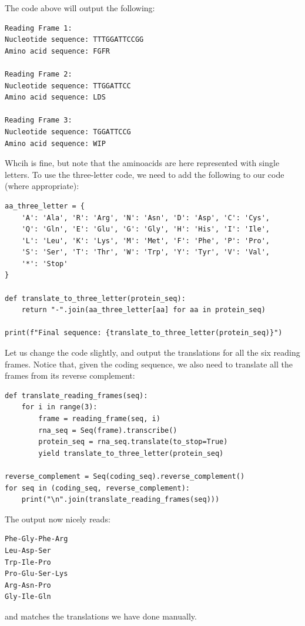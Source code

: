 The code above will output the following:

\vspace*{3mm}
\begin{lstlisting}
Reading Frame 1:
Nucleotide sequence: TTTGGATTCCGG
Amino acid sequence: FGFR

Reading Frame 2:
Nucleotide sequence: TTGGATTCC
Amino acid sequence: LDS

Reading Frame 3:
Nucleotide sequence: TGGATTCCG
Amino acid sequence: WIP
\end{lstlisting}

Whcih is fine, but note that the aminoacids are here represented with single letters. To use the three-letter code, we need to add the following to our code (where appropriate):

\vspace*{3mm}
\begin{lstlisting}
aa_three_letter = {
    'A': 'Ala', 'R': 'Arg', 'N': 'Asn', 'D': 'Asp', 'C': 'Cys',
    'Q': 'Gln', 'E': 'Glu', 'G': 'Gly', 'H': 'His', 'I': 'Ile',
    'L': 'Leu', 'K': 'Lys', 'M': 'Met', 'F': 'Phe', 'P': 'Pro',
    'S': 'Ser', 'T': 'Thr', 'W': 'Trp', 'Y': 'Tyr', 'V': 'Val',
    '*': 'Stop'
}

def translate_to_three_letter(protein_seq):
    return "-".join(aa_three_letter[aa] for aa in protein_seq)

print(f"Final sequence: {translate_to_three_letter(protein_seq)}")
\end{lstlisting}

Let us change the code slightly, and output the translations for all the six reading frames. Notice that, given the coding sequence, we also need to translate all the frames from its reverse complement:

\vspace*{3mm}
\begin{lstlisting}
def translate_reading_frames(seq):
    for i in range(3):
        frame = reading_frame(seq, i)
        rna_seq = Seq(frame).transcribe()
        protein_seq = rna_seq.translate(to_stop=True)
        yield translate_to_three_letter(protein_seq)

reverse_complement = Seq(coding_seq).reverse_complement()
for seq in (coding_seq, reverse_complement):
    print("\n".join(translate_reading_frames(seq)))
\end{lstlisting}

The output now nicely reads:

\vspace*{3mm}
\begin{lstlisting}
Phe-Gly-Phe-Arg
Leu-Asp-Ser
Trp-Ile-Pro
Pro-Glu-Ser-Lys
Arg-Asn-Pro
Gly-Ile-Gln
\end{lstlisting}
%
and matches the translations we have done manually.

